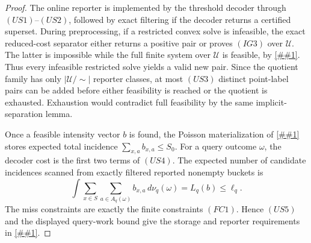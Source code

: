 \documentclass[10pt]{article}
\newcommand{\cref}[1]{\ref{##1}}
\theoremstyle{definition}
\begin{document}
\begin{proof}
   The online reporter is implemented by the threshold decoder through
   \((US1)\)--\((US2)\), followed by exact filtering if the decoder returns a
   certified superset.  During preprocessing, if a restricted convex solve is
   infeasible, the exact reduced-cost separator either returns a positive
   pair or proves \((IG3)\) over \(\mathcal U\).  The latter is impossible
   while the full finite system over \(\mathcal U\) is feasible, by
   \cref{lem:implicit-reduced-gain-separation}.  Thus every infeasible
   restricted solve yields a valid new pair.  Since the quotient family has
   only \(|\mathcal U/{\sim}|\) reporter classes, at most \((US3)\) distinct
   point-label pairs can be added before either feasibility is reached or the
   quotient is exhausted.  Exhaustion would contradict full feasibility by the
   same implicit-separation lemma.

   Once a feasible intensity vector \(b\) is found, the Poisson materialization
   of \cref{cor:rate-coverage-intensity} stores expected total incidence
   \(\sum_{x,a}b_{x,a}\le S_0\).  For a query outcome \(\omega\), the decoder
   cost is the first two terms of \((US4)\).  The expected number of candidate
   incidences scanned from exactly filtered reported nonempty buckets is
   \[
      \int
      \sum_{x\in S}\sum_{a\in A_q(\omega)}b_{x,a}\,d\nu_q(\omega)
      =
      L_q(b)
      \le \ell_q .
   \]
   The miss constraints are exactly the finite constraints \((FC1)\).  Hence
   \((US5)\) and the displayed query-work bound give the storage and reporter
   requirements in \cref{asm:rate-coverage-panel}.
\end{proof}
\end{document}
